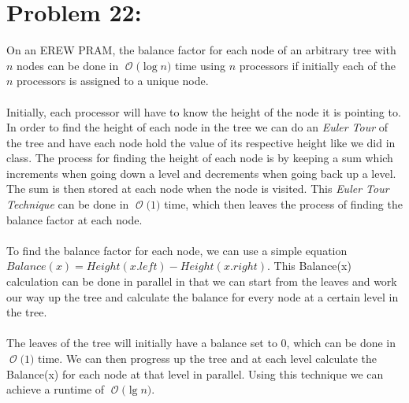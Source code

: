 \documentclass[12pt]{article}
\newcommand{\BigO}[1]{\ensuremath{\operatorname{\mathcal{O}}\bigl(#1\bigr)}}
\begin{document}
\section*{Problem 22: }
On an EREW PRAM, the balance factor for each node of an arbitrary tree with $n$ nodes
can be done in \BigO{\log n} time using $n$ processors
if initially each of the $n$ processors is assigned to a unique node.\\\\
Initially, each processor will have to know the height of the node it is pointing to. In order to find the height of each node in the tree we can do an \textit{Euler Tour} of the tree and have each node hold the value of its respective height like we did in class. The process for finding the height of each node is by keeping a sum which increments when going down a level and decrements when going back up a level. The sum is then stored at each node when the node is visited. This \textit{Euler Tour Technique} can be done in \BigO 1 time, which then leaves the process of finding the balance factor at each node.\\\\
To find the balance factor for each node, we can use a simple equation {$Balance(x) = Height(x.left) - Height(x.right)$}. This Balance(x) calculation can be done in parallel in that we can start from the leaves and work our way up the tree and calculate the balance for every node at a certain level in the tree.\\\\
The leaves of the tree will initially have a balance set to 0, which can be done in \BigO 1 time. We can then progress up the tree and at each level calculate the Balance(x) for each node at that level in parallel. Using this technique we can achieve a runtime of \BigO{ \lg n}.
\end{document}
